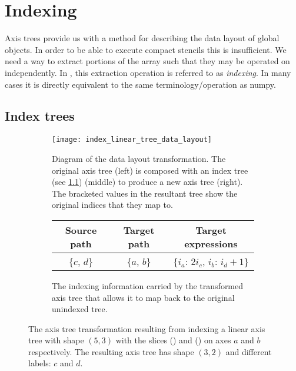 \documentclass[thesis]{subfiles}
\begin{document}

\chapter{Indexing}

Axis trees provide us with a method for describing the data layout of global objects.
In order to be able to execute compact stencils this is insufficient.
We need a way to extract portions of the array such that they may be operated on independently.
In , this extraction operation is referred to as \textit{indexing}.
In many cases it is directly equivalent to the same terminology/operation as numpy.

\section{Index trees}
\label{sec:index_trees}

\begin{figure}[h]
  \centering
  \begin{subfigure}{\textwidth}
    \centering
    \texttt{[image: index\_linear\_tree\_data\_layout]}
    \caption{
      Diagram of the data layout transformation.
      The original axis tree (left) is composed with an index tree (see \cref{sec:index_trees}) (middle) to produce a new axis tree (right).
      The bracketed values in the resultant tree show the original indices that they map to.
    }
    \label{fig:index_linear_tree_data_layout}
  \end{subfigure}

  \vspace{1em}

  \begin{subfigure}{\textwidth}
    \centering
    \begin{tabular}{|c|c|c|}
      \hline
      \textbf{Source path} & \textbf{Target path} & \textbf{Target expressions} \\
      \hline
      \{$c$, $d$\} & \{$a$, $b$\} & \{$i_a$: $2 i_c$, $i_b$: $i_d+1$\} \\
      \hline
    \end{tabular}
    \caption{
      The indexing information carried by the transformed axis tree that allows it to map back to the original unindexed tree.
    }
    \label{fig:index_linear_tree_exprs}
  \end{subfigure}

  \caption{
    The axis tree transformation resulting from indexing a linear axis tree with shape $(5, 3)$ with the slices () and () on axes $a$ and $b$ respectively.
    The resulting axis tree has shape $(3, 2)$ and different labels: $c$ and $d$.
  }
  \label{fig:index_linear_tree_all}
\end{figure}
\end{document}
